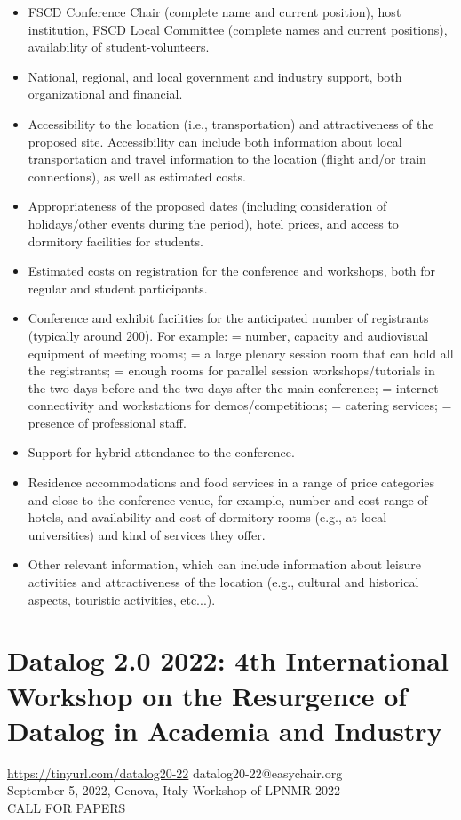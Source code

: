 \documentclass[prodmode,acmtecs]{acmsmall} %
\begin{document}
\begin{itemize}
\begin{itemize}\item  FSCD Conference Chair (complete name and current position), host institution, FSCD Local Committee (complete names and current positions), availability of student-volunteers.
\item  National, regional, and local government and industry support, both organizational and financial.
\item  Accessibility to the location (i.e., transportation) and attractiveness of the proposed site. Accessibility can include both information about local transportation and travel information to the location (flight and/or train connections), as well as estimated costs.
\item  Appropriateness of the proposed dates (including consideration of holidays/other events during the period), hotel prices, and access to dormitory facilities for students.
\item  Estimated costs on registration for the conference and workshops, both for regular and student participants.
\item  Conference and exhibit facilities for the anticipated number of registrants (typically around 200). For example: = number, capacity and audiovisual equipment of meeting rooms; = a large plenary session room that can hold all the registrants; = enough rooms for parallel session workshops/tutorials in the two days before and the two days after the main conference; = internet connectivity and workstations for demos/competitions; = catering services; = presence of professional staff.
\item  Support for hybrid attendance to the conference.
\item  Residence accommodations and food services in a range of price categories and close to the conference venue, for example, number and cost range of hotels, and availability and cost of dormitory rooms (e.g., at local universities) and kind of services they offer.
\item  Other relevant information, which can include information about leisure activities and attractiveness of the location (e.g., cultural and historical aspects, touristic activities, etc...). 
\end{itemize} 
\end{itemize}\section{Datalog 2.0 2022:  4th International Workshop on the Resurgence of Datalog in Academia and Industry}\label{Datalog202022}   \href{https://tinyurl.com/datalog20-22}{https://tinyurl.com/datalog20-22} datalog20-22@easychair.org \\ 
   September 5, 2022, Genova, Italy Workshop of LPNMR 2022\\ 
CALL FOR PAPERS 
\end{document}
